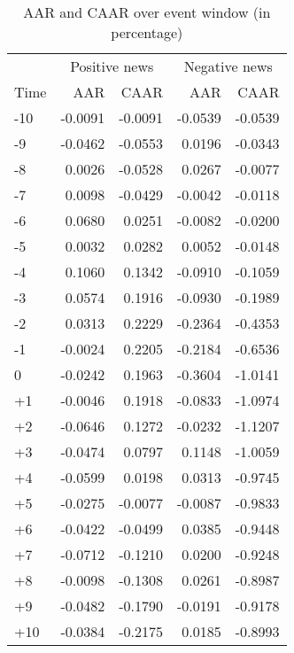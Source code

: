 \begin{table}[ht]
\centering
\begin{tabular}{lrrrr}
  \hline
   & \multicolumn{2}{c}{Positive news} & \multicolumn{2}{c}{Negative news}  \\
  Time & AAR & CAAR & AAR & CAAR \\
 \hline
-10 & -0.0091 & -0.0091 & -0.0539 & -0.0539 \\ 
  -9 & -0.0462 & -0.0553 & 0.0196 & -0.0343 \\ 
  -8 & 0.0026 & -0.0528 & 0.0267 & -0.0077 \\ 
  -7 & 0.0098 & -0.0429 & -0.0042 & -0.0118 \\ 
  -6 & 0.0680 & 0.0251 & -0.0082 & -0.0200 \\ 
  -5 & 0.0032 & 0.0282 & 0.0052 & -0.0148 \\ 
  -4 & 0.1060 & 0.1342 & -0.0910 & -0.1059 \\ 
  -3 & 0.0574 & 0.1916 & -0.0930 & -0.1989 \\ 
  -2 & 0.0313 & 0.2229 & -0.2364 & -0.4353 \\ 
  -1 & -0.0024 & 0.2205 & -0.2184 & -0.6536 \\ 
  0 & -0.0242 & 0.1963 & -0.3604 & -1.0141 \\ 
  +1 & -0.0046 & 0.1918 & -0.0833 & -1.0974 \\ 
  +2 & -0.0646 & 0.1272 & -0.0232 & -1.1207 \\ 
  +3 & -0.0474 & 0.0797 & 0.1148 & -1.0059 \\ 
  +4 & -0.0599 & 0.0198 & 0.0313 & -0.9745 \\ 
  +5 & -0.0275 & -0.0077 & -0.0087 & -0.9833 \\ 
  +6 & -0.0422 & -0.0499 & 0.0385 & -0.9448 \\ 
  +7 & -0.0712 & -0.1210 & 0.0200 & -0.9248 \\ 
  +8 & -0.0098 & -0.1308 & 0.0261 & -0.8987 \\ 
  +9 & -0.0482 & -0.1790 & -0.0191 & -0.9178 \\ 
  +10 & -0.0384 & -0.2175 & 0.0185 & -0.8993 \\ 
   \hline
\end{tabular}
\caption{AAR and CAAR over event window (in percentage)} 
\end{table}

